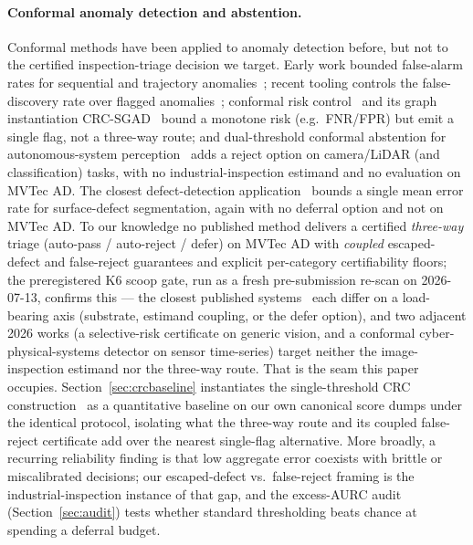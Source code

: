 \documentclass[11pt]{article}
\begin{document}
\paragraph{Conformal anomaly detection and abstention.} Conformal methods have been applied to
anomaly detection before, but not to the certified inspection-triage decision we target. Early
work bounded false-alarm rates for sequential and trajectory
anomalies~\citep{laxhammar2011sequential,laxhammar2015inductive}; recent tooling controls the
false-discovery rate over flagged anomalies~\citep{hennhofer2026nonconform}; conformal risk
control~\citep{angelopoulos2022crc} and its graph instantiation
CRC-SGAD~\citep{bai2025crcsgad} bound a monotone risk (e.g.\ FNR/FPR) but emit a single flag, not
a three-way route; and dual-threshold conformal abstention for autonomous-system
perception~\citep{kumar2025beyond} adds a reject option on camera/LiDAR (and classification)
tasks, with no industrial-inspection estimand and no evaluation on MVTec AD. The closest
defect-detection application~\citep{shen2025conformal} bounds a single mean error rate for
surface-defect segmentation, again with no deferral option and not on MVTec AD. To our knowledge
no published method delivers a certified \emph{three-way} triage (auto-pass / auto-reject / defer)
on MVTec AD with \emph{coupled} escaped-defect and false-reject guarantees and explicit
per-category certifiability floors; the preregistered K6 scoop gate, run as a fresh pre-submission
re-scan on 2026-07-13, confirms this --- the closest published
systems~\citep{kumar2025beyond,bai2025crcsgad,shen2025conformal} each differ on a load-bearing axis
(substrate, estimand coupling, or the defer option), and two adjacent 2026 works (a selective-risk
certificate on generic vision, and a conformal cyber-physical-systems detector on sensor
time-series) target neither the image-inspection estimand nor the three-way route. That
is the seam this paper occupies. Section~\ref{sec:crcbaseline} instantiates the single-threshold
CRC construction~\citep{angelopoulos2022crc} as a quantitative baseline on our own canonical score
dumps under the identical protocol, isolating what the three-way route and its coupled
false-reject certificate add over the nearest single-flag alternative. More broadly, a recurring
reliability finding is that low
aggregate error coexists with brittle or miscalibrated decisions; our escaped-defect vs.\
false-reject framing is the industrial-inspection instance of that gap, and the excess-AURC audit
(Section~\ref{sec:audit}) tests whether standard thresholding beats chance at spending a deferral
budget.
\end{document}
